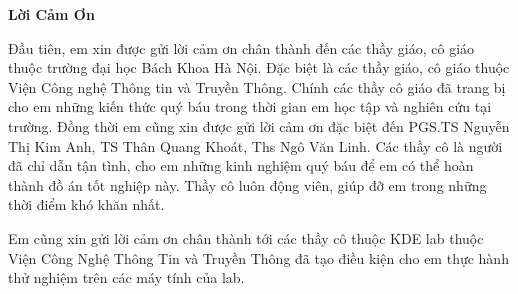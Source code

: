 \documentclass[fontsize=13pt]{scrartcl}
\begin{document}
\newpage
\begin{center}
\textbf{Lời Cảm Ơn}
\end{center}
Đầu tiên, em xin được gửi lời cảm ơn chân thành đến các thầy giáo, cô giáo thuộc trường đại học Bách Khoa Hà Nội. Đặc biệt là các thầy giáo, cô giáo thuộc Viện Công nghệ Thông tin và Truyền Thông. Chính các thầy cô giáo đã trang bị cho em những kiến thức quý báu trong thời gian em học tập và nghiên cứu tại trường. Đồng thời em cũng xin được gửi lời cảm ơn đặc biệt đến  PGS.TS Nguyễn Thị Kim Anh, TS Thân Quang Khoát, Ths Ngô Văn Linh. Các thầy cô là người đã chỉ dẫn tận tình, cho em những kinh nghiệm quý báu để em có thể hoàn thành đồ án tốt nghiệp này. Thầy cô luôn động viên, giúp đỡ em trong những thời điểm khó khăn nhất.
\par 
Em cũng xin gửi lời cảm ơn chân thành tới các thầy cô thuộc KDE lab thuộc Viện Công Nghệ Thông Tin và Truyền Thông đã tạo điều kiện cho em thực hành thử nghiệm trên các máy tính của lab.
\end{document}
